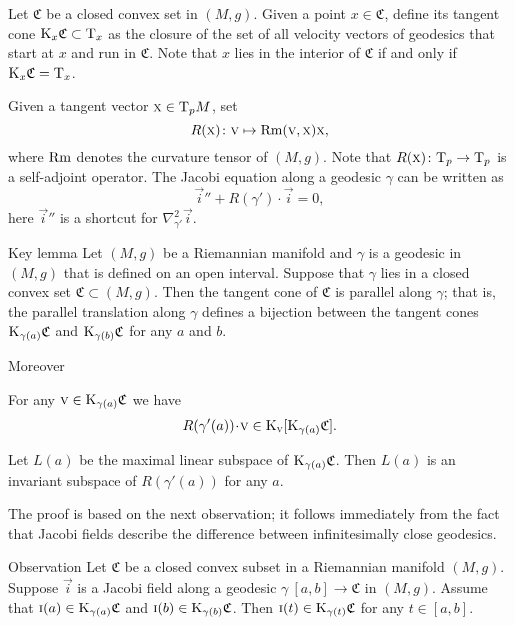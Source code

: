\documentclass[a4paper,10pt]{article}
\begin{document}
Let $\mathfrak{C}$ be a closed convex set in $(M,g)$.
Given a point $x\in \mathfrak{C}$, define its tangent cone $\mathrm{K}_x\mathfrak{C}\subset \mathrm{T}_x$ as the closure of the set of all velocity vectors of geodesics that start at $x$ and run in $\mathfrak{C}$.
Note that $x$ lies in the interior of $\mathfrak{C}$ if and only if $\mathrm{K}_x\mathfrak{C}=\mathrm{T}_x$.

Given a tangent vector $\text{\sc{x}}\in\mathrm{T}_pM$, set
\[R(\text{\sc{x}})\colon\text{\sc{v}}\mapsto \operatorname{Rm}(\text{\sc{v}},\text{\sc{x}})\text{\sc{x}},\]
where $\operatorname{Rm}$ denotes the curvature tensor of $(M,g)$.
Note that $R(\text{\sc{x}})\colon\mathrm{T}_p\to \mathrm{T}_p$ is a self-adjoint operator.
The Jacobi equation along a geodesic $\gamma$ can be written as 
\[\vec{i}''+R(\gamma')\cdot \vec{i}=0,\]
here  $\vec{i}''$ is a shortcut for $\nabla^2_{\gamma'}\vec{i}$.
 
\begin{thm}{Key lemma}\label{lem:key}
Let $(M,g)$ be a Riemannian manifold and $\gamma$ is a geodesic in $(M,g)$ that is defined on an open interval.
Suppose that $\gamma$ lies in a closed convex set $\mathfrak{C}\subset (M,g)$.
Then the tangent cone of $\mathfrak{C}$ is parallel along $\gamma$; that is, the parallel translation along $\gamma$ defines a bijection between the tangent cones $\mathrm{K}_{\gamma(a)}\mathfrak{C}$ and $\mathrm{K}_{\gamma(b)}\mathfrak{C}$ for any $a$ and $b$.

Moreover
\begin{subthm}{}
For any $\text{\sc{v}}\in \mathrm{K}_{\gamma(a)}\mathfrak{C}$ we have
\[R(\gamma'(a))\cdot \vec{v}\in \K_\vec{v}[\K_{\gamma(a)}\mathfrak{C}].\]
\end{subthm}

\begin{subthm}{} Let $L(a)$ be the maximal linear subspace of $\mathrm{K}_{\gamma(a)}\mathfrak{C}$.
Then $L(a)$ is an invariant subspace of $R(\gamma'(a))$ for any $a$.
\end{subthm}

\end{thm}

The proof is based on the next observation;
it follows immediately from the fact that Jacobi fields describe the difference between infinitesimally close geodesics.

\begin{thm}{Observation}
Let  $\mathfrak{C}$ be a closed convex subset in a Riemannian manifold $(M,g)$.
Suppose $\vec{i}$ is a Jacobi field along a geodesic $\gamma\:[a,b]\to \mathfrak{C}$ in $(M,g)$.
Assume that $\text{\sc{i}}(a)\in \mathrm{K}_{\gamma(a)}\mathfrak{C}$ and $\text{\sc{i}}(b)\in \mathrm{K}_{\gamma(b)}\mathfrak{C}$.
Then $\text{\sc{i}}(t)\in \mathrm{K}_{\gamma(t)}\mathfrak{C}$ for any $t\in [a,b]$.
\end{thm}
\end{document}
